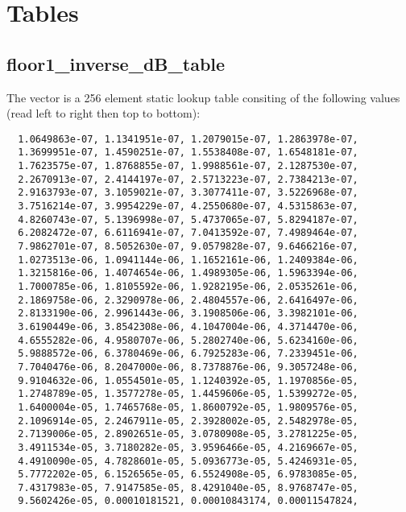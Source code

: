\section{Tables} \label{vorbis:spec:tables}

\subsection{floor1\_inverse\_dB\_table} \label{vorbis:spec:floor1:inverse:dB:table}

The vector  is a 256 element static
lookup table consiting of the following values (read left to right
then top to bottom):

\begin{Verbatim}
  1.0649863e-07, 1.1341951e-07, 1.2079015e-07, 1.2863978e-07,
  1.3699951e-07, 1.4590251e-07, 1.5538408e-07, 1.6548181e-07,
  1.7623575e-07, 1.8768855e-07, 1.9988561e-07, 2.1287530e-07,
  2.2670913e-07, 2.4144197e-07, 2.5713223e-07, 2.7384213e-07,
  2.9163793e-07, 3.1059021e-07, 3.3077411e-07, 3.5226968e-07,
  3.7516214e-07, 3.9954229e-07, 4.2550680e-07, 4.5315863e-07,
  4.8260743e-07, 5.1396998e-07, 5.4737065e-07, 5.8294187e-07,
  6.2082472e-07, 6.6116941e-07, 7.0413592e-07, 7.4989464e-07,
  7.9862701e-07, 8.5052630e-07, 9.0579828e-07, 9.6466216e-07,
  1.0273513e-06, 1.0941144e-06, 1.1652161e-06, 1.2409384e-06,
  1.3215816e-06, 1.4074654e-06, 1.4989305e-06, 1.5963394e-06,
  1.7000785e-06, 1.8105592e-06, 1.9282195e-06, 2.0535261e-06,
  2.1869758e-06, 2.3290978e-06, 2.4804557e-06, 2.6416497e-06,
  2.8133190e-06, 2.9961443e-06, 3.1908506e-06, 3.3982101e-06,
  3.6190449e-06, 3.8542308e-06, 4.1047004e-06, 4.3714470e-06,
  4.6555282e-06, 4.9580707e-06, 5.2802740e-06, 5.6234160e-06,
  5.9888572e-06, 6.3780469e-06, 6.7925283e-06, 7.2339451e-06,
  7.7040476e-06, 8.2047000e-06, 8.7378876e-06, 9.3057248e-06,
  9.9104632e-06, 1.0554501e-05, 1.1240392e-05, 1.1970856e-05,
  1.2748789e-05, 1.3577278e-05, 1.4459606e-05, 1.5399272e-05,
  1.6400004e-05, 1.7465768e-05, 1.8600792e-05, 1.9809576e-05,
  2.1096914e-05, 2.2467911e-05, 2.3928002e-05, 2.5482978e-05,
  2.7139006e-05, 2.8902651e-05, 3.0780908e-05, 3.2781225e-05,
  3.4911534e-05, 3.7180282e-05, 3.9596466e-05, 4.2169667e-05,
  4.4910090e-05, 4.7828601e-05, 5.0936773e-05, 5.4246931e-05,
  5.7772202e-05, 6.1526565e-05, 6.5524908e-05, 6.9783085e-05,
  7.4317983e-05, 7.9147585e-05, 8.4291040e-05, 8.9768747e-05,
  9.5602426e-05, 0.00010181521, 0.00010843174, 0.00011547824,

\end{Verbatim}
